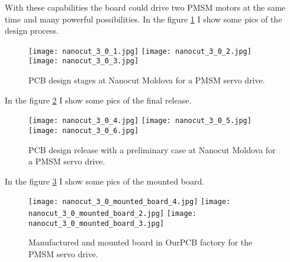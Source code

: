    With these capabilities the board could drive two PMSM motors at the same time and many
   powerful possibilities.  In the figure \ref{fig:nanocut_3_0_1} I show some pics of the design
   process.
  \begin{figure}
      \begin{center}
         \texttt{[image: nanocut\_3\_0\_1.jpg]}
         \texttt{[image: nanocut\_3\_0\_2.jpg]}
         \texttt{[image: nanocut\_3\_0\_3.jpg]}
      \end{center}
      \caption{PCB design stages at Nanocut Moldova for a PMSM servo drive.}
      \label{fig:nanocut_3_0_1}
   \end{figure}
In the figure \ref{fig:nanocut_3_0_2} I show some pics of the final release.
  \begin{figure}
      \begin{center}
         \texttt{[image: nanocut\_3\_0\_4.jpg]}
         \texttt{[image: nanocut\_3\_0\_5.jpg]}
         \texttt{[image: nanocut\_3\_0\_6.jpg]}
      \end{center}
      \caption{PCB design release with a preliminary case at Nanocut Moldova for a PMSM servo drive.}
      \label{fig:nanocut_3_0_2}
   \end{figure}

In the figure \ref{fig:nanocut_3_0_3} I show some pics of the mounted board.
  \begin{figure}
      \begin{center}
         \texttt{[image: nanocut\_3\_0\_mounted\_board\_4.jpg]}
         \texttt{[image: nanocut\_3\_0\_mounted\_board\_2.jpg]}
         \texttt{[image: nanocut\_3\_0\_mounted\_board\_3.jpg]}
      \end{center}
      \caption{Manufactured and mounted board in OurPCB factory for the PMSM servo drive.}
      \label{fig:nanocut_3_0_3}
   \end{figure}
